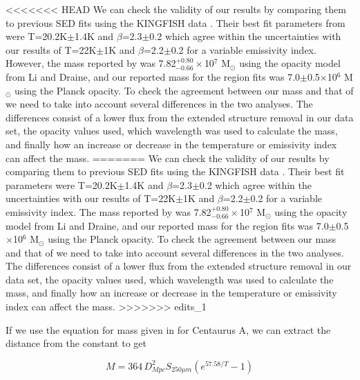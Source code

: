 <<<<<<< HEAD
We can check the validity of our results by comparing them to previous SED fits using the KINGFISH data \citep{galametz2012}.  Their best fit parameters from were T=20.2K$\pm$1.4K and $\beta$=2.3$\pm$0.2 which agree within the uncertainties with our results of T=22K$\pm$1K and $\beta$=2.2$\pm$0.2 for a variable emissivity index.  However, the mass reported by \cite{galametz2012} was 7.82$^{+0.80}_{-0.66}\times$10$^7$ M$_\odot$ using the opacity model from Li and Draine, and our reported mass for the region fits was 7.0$\pm$0.5$\times$10$^6$ M$_\odot$ using the Planck opacity.  To check the agreement between our mass and that of \cite{galametz2012} we need to take into account several differences in the two analyses. The differences consist of a lower flux from the extended structure removal in our data set, the opacity values used, which wavelength was used to calculate the mass, and finally how an increase or decrease in the temperature or emissivity index can affect the mass.  
=======
We can check the validity of our results by comparing them to previous SED fits using the KINGFISH data \citep{galametz2012}.  Their best fit parameters were T=20.2K$\pm$1.4K and $\beta$=2.3$\pm$0.2 which agree within the uncertainties with our results of T=22K$\pm$1K and $\beta$=2.2$\pm$0.2 for a variable emissivity index.  The mass reported by \cite{galametz2012} was 7.82$^{+0.80}_{-0.66}\times$10$^7$ M$_\odot$ using the opacity model from Li and Draine, and our reported mass for the region fits was 7.0$\pm$0.5$\times$10$^6$ M$_\odot$ using the Planck opacity.  To check the agreement between our mass and that of \cite{galametz2012} we need to take into account several differences in the two analyses. The differences consist of a lower flux from the extended structure removal in our data set, the opacity values used, which wavelength was used to calculate the mass, and finally how an increase or decrease in the temperature or emissivity index can affect the mass.  
>>>>>>> edits_1

If we use the equation for mass given in \cite{parkin2012} for Centaurus A, we can extract the distance from the constant to get 

\begin{equation}\label{eq:mass_test}
  M=364\,D^{2}_{Mpc}S_{250\mu m}\left(e^{57.58 / T} - 1\right)
\end{equation}

